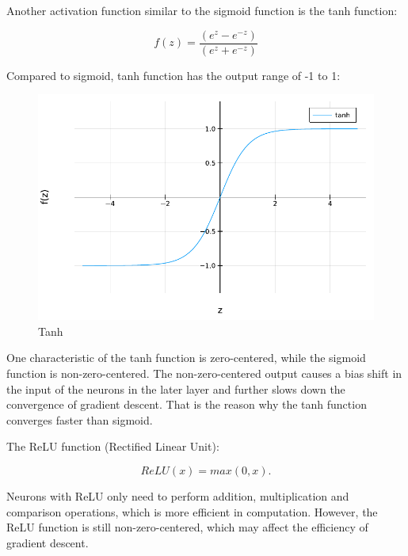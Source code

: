 \documentclass[
	parskip, 			   %
	twoside, 			   %
	DIV=14, 			   %
	BCOR=15.0mm, 		   %
	headsepline, 		   %
	open=right, 		   %
	captions=tableheading, %
	bibliography=totoc,    %
	numbers=noenddot       %
]{scrreprt}
\begin{document}
Another activation function similar to the sigmoid function is the tanh function:

\begin{equation}
    \label{eq:tanh}
    f(z)=\frac{\left(e^{z}-e^{-z}\right)}{\left(e^{z}+e^{-z}\right)}
\end{equation}

Compared to sigmoid, tanh function has the output range of -1 to 1:

\begin{figure}[h!]
    \centering
    \includegraphics[scale=0.7]{figures/tanh.pdf}
    \caption{Tanh}
    \label{fig:tanh}
\end{figure}

One characteristic of the tanh function is zero-centered, while the sigmoid function is non-zero-centered. The non-zero-centered output causes a bias shift in the input of the neurons in the later layer and further slows down the convergence of gradient descent. That is the reason why the tanh function converges faster than sigmoid.

The ReLU function (Rectified Linear Unit):

\begin{equation}
    \label{eq:ReLU}
    ReLU(x) = max(0,x).
\end{equation}

Neurons with ReLU only need to perform addition, multiplication and comparison operations, which is more efficient in computation. However, the ReLU function is still non-zero-centered, which may affect the efficiency of gradient descent. 
\end{document}

